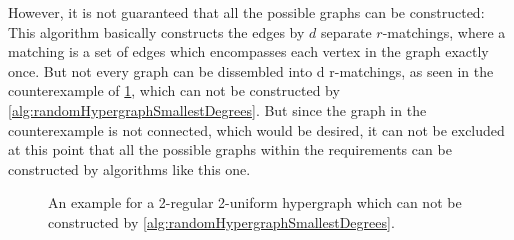 However, it is not guaranteed that all the possible graphs can be constructed: %
This algorithm basically constructs the edges by $d$ separate $r$-matchings, where a matching is a set of edges which encompasses each vertex in the graph exactly once. %
But not every graph can be dissembled into d r-matchings, as seen in the counterexample of \cref{fig:counterexample_matching}, which can not be constructed by \cref{alg:randomHypergraphSmallestDegrees}. But since the graph in the counterexample is not connected, which would be desired, it can not be excluded at this point that all the possible graphs within the requirements can be constructed by algorithms like this one.
 

\begin{figure} [htpb]
	\centering
	\caption[Counterexample hypergraph]{An example for a 2-regular 2-uniform hypergraph which can not be constructed by \cref{alg:randomHypergraphSmallestDegrees}.  }\label{fig:counterexample_matching}
\end{figure}


